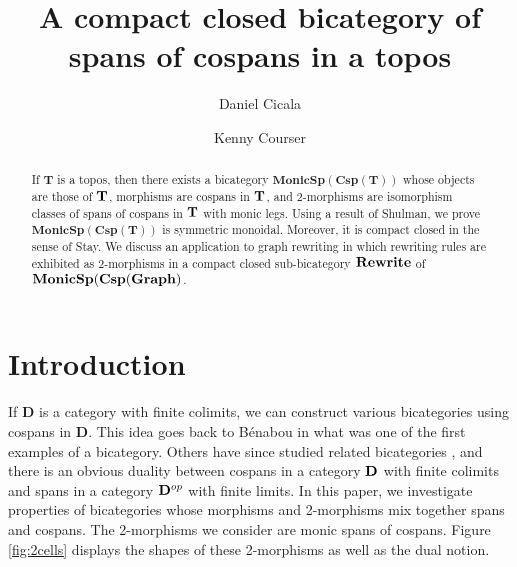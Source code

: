 \documentclass[11pt]{amsart}
\newcommand{\cat}[1]{\mathbf{#1}}
\theoremstyle{remark}
\theoremstyle{definition}
\begin{document}
\sloppy	

\begin{abstract}
If $\cat{T}$ is a topos, 
then there exists a bicategory 
$\cat{MonicSp(Csp(T))}$ 
whose objects are those of $\bold{T}$,
morphisms are cospans in $\bold{T}$, 
and 2-morphisms are 
isomorphism classes of spans of cospans 
in $\bold{T}$ with monic legs. 
Using a result of Shulman, 
we prove $\cat{MonicSp(Csp(T))}$ is 
symmetric monoidal. 
Moreover, it is compact closed in the sense of Stay.
We discuss an application
to graph rewriting in which 
rewriting rules are exhibited as 
2-morphisms in a compact closed sub-bicategory 
$\bold{Rewrite}$ of $\bold{MonicSp(Csp(Graph)}$.
\end{abstract}

\title{A compact closed bicategory of spans of cospans in a topos}
\author{Daniel Cicala \and Kenny Courser}
\maketitle

\section{Introduction} 
\label{sec:Introduction}

If $\cat{D}$ is a category with finite colimits, 
we can construct various bicategories using cospans in $\cat{D}$. 
This idea goes back to B\'{e}nabou 
	\cite{Be} 
in what was one of the first examples of a bicategory. 
Others have since studied related bicategories
	\cite{Cour,Reb,Stay}, and there is an obvious duality between cospans in a category $\bold{D}$ with finite colimits and spans in a category $\bold{D}^{op}$ with finite limits.
In this paper, we investigate properties of 
bicategories whose morphisms and 2-morphisms mix together spans and cospans.
The 2-morphisms we consider are monic spans of cospans.  
Figure \ref{fig:2cells} displays the shapes of these 2-morphisms as well as the dual notion.
\end{document}
